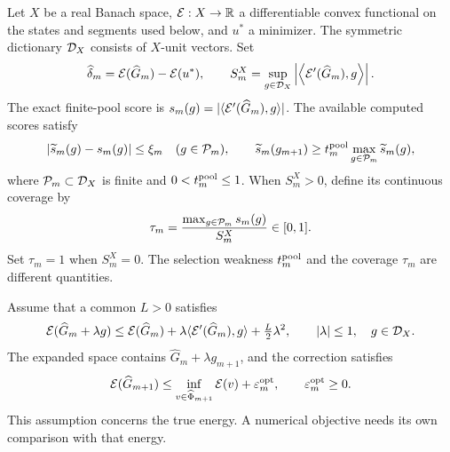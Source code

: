 \documentclass[11pt]{article}
\theoremstyle{remark}
\begin{document}
Let $X$ be a real Banach space, $\mathcal E:X\to\mathbb R$ a differentiable convex
functional on the states and segments used below, and $u^*$ a minimizer.
The symmetric dictionary $\mathcal D_X$ consists of $X$-unit vectors. Set
\[
 \widehat\delta_m=\mathcal E(\widehat G_m)-\mathcal E(u^*),\qquad
 S_m^X=\sup_{g\in\mathcal D_X}\left|\left\langle\mathcal E'(\widehat G_m),g\right\rangle\right|.
\]
The exact finite-pool score is $s_m(g)=|\langle\mathcal E'(\widehat G_m),g\rangle|$.
The available computed scores satisfy
\begin{equation}
 \left|\widetilde s_m(g)-s_m(g)\right|\leq\xi_m\quad(g\in\mathcal P_m),\qquad
 \widetilde s_m(g_{m+1})\geq t_m^{\rm pool}
                  \max_{g\in\mathcal P_m}\widetilde s_m(g),
 \label{eq:c5-oracle}
\end{equation}
where $\mathcal P_m\subset\mathcal D_X$ is finite and $0<t_m^{\rm pool}\leq1$.
When $S_m^X>0$, define its continuous coverage by
\begin{equation}
 \tau_m=\frac{\max_{g\in\mathcal P_m}s_m(g)}{S_m^X}\in[0,1].
 \label{eq:c5-coverage}
\end{equation}
Set $\tau_m=1$ when $S_m^X=0$. The selection weakness $t_m^{\rm pool}$
and the coverage $\tau_m$ are different quantities.

Assume that a common $L>0$ satisfies
\begin{equation}
 \mathcal E(\widehat G_m+\lambda g)
 \leq\mathcal E(\widehat G_m)+\lambda\langle\mathcal E'(\widehat G_m),g\rangle
            +\tfrac L2\lambda^2,\qquad |\lambda|\leq1,\quad g\in\mathcal D_X.
 \label{eq:c5-directional}
\end{equation}
The expanded space contains $\widehat G_m+\lambda g_{m+1}$, and the
correction satisfies
\begin{equation}
 \mathcal E(\widehat G_{m+1})\leq
 \inf_{v\in\widehat\Phi_{m+1}}\mathcal E(v)+\varepsilon_m^{\rm opt},
 \qquad \varepsilon_m^{\rm opt}\geq0 .
 \label{eq:c5-correction}
\end{equation}
This assumption concerns the true energy. A numerical objective needs its
own comparison with that energy.
\end{document}

